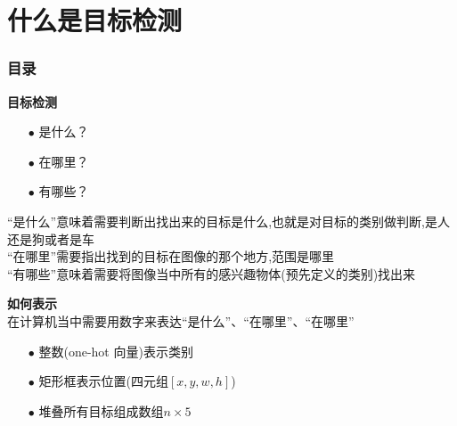 \section{什么是目标检测}

\begin{frame}[allowframebreaks]
    \frametitle{\textsc{目录}} \vspace{-0.3cm}
    \begin{spacing}{0.0}
    \end{spacing}   %
\end{frame}



\begin{frame}
    \noindent\large\textbf{目标检测}
    \vspace{0.4cm}
    \begin{itemize}
        \item[$ \bullet $] 是什么？
        \item[$ \bullet $] 在哪里？
        \item[$ \bullet $] 有哪些？
    \end{itemize}
    \vspace{1cm}
    “是什么”意味着需要判断出找出来的目标是什么,也就是对目标的类别做判断,是人还是狗或者是车\\
    \vspace{1em}
    “在哪里”需要指出找到的目标在图像的那个地方,范围是哪里\\
    \vspace{1em}
    “有哪些”意味着需要将图像当中所有的感兴趣物体(预先定义的类别)找出来\\
\end{frame}

\begin{frame}
    \noindent\large\textbf{如何表示}\\
    在计算机当中需要用数字来表达“是什么”、“在哪里”、“在哪里”
    \vspace{1em}
    \begin{itemize}
        \item[$ \bullet $] 整数(one-hot 向量)表示类别
        \item[$ \bullet $] 矩形框表示位置(四元组$[x,y,w,h]$)
        \item[$ \bullet $] 堆叠所有目标组成数组$n\times5$
    \end{itemize}
    \vspace{1em}
    \begin{figure}
        \hspace{1cm}
    \end{figure}
\end{frame}

